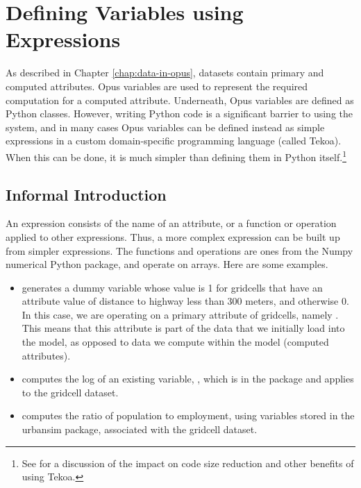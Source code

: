 \chapter{Defining Variables using Expressions}
\label{chapter:expressions}

As described in Chapter \ref{chap:data-in-opus}, datasets contain primary
and computed attributes.  Opus variables are used to represent the required
computation for a computed attribute.  Underneath, Opus variables are
defined as Python classes.  However, writing Python code is a significant
barrier to using the system, and in many cases Opus variables can be
defined instead as simple expressions in a custom domain-specific
programming language (called Tekoa).  When this can be done, it is much
simpler than defining them in Python itself.\footnote{See
  \cite{borning-dgo-tekoa-2008} for a discussion of the impact on code size
  reduction and other benefits of using Tekoa.}

\section{Informal Introduction}

An expression consists of the name of an attribute, or a function or
operation applied to other expressions.  Thus, a more complex expression
can be built up from simpler expressions.  The functions and operations are
ones from the Numpy  numerical Python package, and operate on
arrays.  Here are some examples.

\begin{itemize}

\item {} generates a dummy
  variable whose value is 1 for gridcells that have an attribute value of
  distance to highway less than 300 meters, and otherwise 0.  In this case,
  we are operating on a primary attribute of gridcells, namely
  .  This means that this
  attribute is part of the data that we initially load into the model, as
  opposed to data we compute within the model (computed attributes).  

\item {} computes the log of
  an existing variable, , which is in the
   package and applies to the gridcell dataset.

\item {}
  computes the ratio of population to employment, using variables stored 
  in the urbansim package, associated with the gridcell dataset.

\end{itemize}


